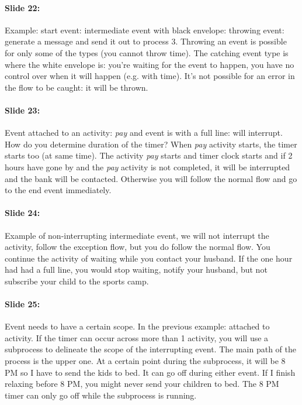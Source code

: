 \documentclass[10pt,a4paper]{report}
\begin{document}
\paragraph{Slide 22:}Example: start event: intermediate event with black envelope: throwing event: generate a message and send it out to process 3. Throwing an event is possible for only some of the types (you cannot throw time). The catching event type is where the white envelope is: you're waiting for the event to happen, you have no control over when it will happen (e.g. with time). It's not possible for an error in the flow to be caught: it will be thrown.

\paragraph{Slide 23:}Event attached to an activity: \textit{pay} and event is with a full line: will interrupt. How do you determine duration of the timer? When \textit{pay} activity starts, the timer starts too (at same time). The activity \textit{pay} starts and timer clock starts and if 2 hours have gone by and the \textit{pay} activity is not completed, it will be interrupted and the bank will be contacted. Otherwise you will follow the normal flow and go to the end event immediately.

\paragraph{Slide 24:}Example of non-interrupting intermediate event, we will not interrupt the activity, follow the exception flow, but you do follow the normal flow. You continue the activity of waiting while you contact your husband. If the one hour had had a full line, you would stop waiting, notify your husband, but not subscribe your child to the sports camp.

\paragraph{Slide 25:}Event needs to have a certain scope. In the previous example: attached to activity. If the timer can occur across more than 1 activity, you will use a subprocess to delineate the scope of the interrupting event. The main path of the process is the upper one. At a certain point during the subprocess, it will be 8 PM so I have to send the kids to bed. It can go off during either event. If I finish relaxing before 8 PM, you might never send your children to bed. The 8 PM timer can only go off while the subprocess is running.
\end{document}
